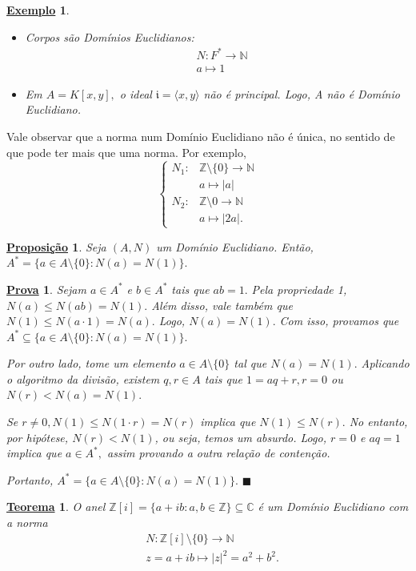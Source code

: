 \documentclass{article}
\newtheorem*{theorem*}{\underline{Teorema}}
\newtheorem*{prop*}{\underline{Proposi\c c\~ao}}
\newtheorem{example}{\underline{Exemplo}}
\newtheorem*{proof*}{\underline{Prova}}
\renewcommand\qedsymbol{$\blacksquare$}
\begin{document}
\begin{example}
  \begin{itemize}
    \item[1)] Corpos são Domínios Euclidianos:
      \begin{align*}
    &N:F^{*}\rightarrow \mathbb{N}\\
    &a\mapsto 1
      \end{align*}
    \item[2)] Em \(A = K[x, y],\) o ideal \(\mathfrak{i} = \langle x, y \rangle\) não é principal. Logo, A não é Domínio Euclidiano.
  \end{itemize}
\end{example}
Vale observar que a norma num Domínio Euclidiano não é única, no sentido de que pode ter mais que uma norma. Por exemplo,
\[
  \left\{\begin{array}{ll}
      N_{1}:&\mathbb{Z}\setminus{\{0\}}\rightarrow \mathbb{N}\\
            &a\mapsto |a|\\
      N_{2}:&\mathbb{Z}\setminus{0}\rightarrow \mathbb{N}\\
            &a\mapsto |2a|.
  \end{array}\right.
\]
\begin{prop*}
  Seja \((A, N)\) um Domínio Euclidiano. Então, \(A^{*}=\{a\in A\setminus{\{0\}}: N(a) = N(1)\}.\)
\end{prop*}
\begin{proof*}
  Sejam \(a\in A^{*}\) e \(b\in A^{*}\) tais que \(ab = 1.\) Pela propriedade 1,
  \(N(a)\leq N(ab) = N(1).\) Além disso, vale também que \(N(1)\leq N(a \cdot 1) = N(a).\) Logo,
  \(N(a) = N(1).\) Com isso, provamos que \(A^{*}\subseteq{\{a\in A\setminus{\{0\}}: N(a) = N(1)\}}.\)

  Por outro lado, tome um elemento \(a\in A\setminus{\{0\}}\) tal que \(N(a) = N(1).\) Aplicando o algoritmo da divisão,
  existem \(q, r\in A\) tais que \(1 = aq + r, r = 0\) ou \(N(r) < N(a) = N(1).\)

  Se \(r\neq0, N(1)\leq N(1 \cdot r) = N(r)\) implica que \(N(1)\leq N(r).\) No entanto, por hipótese,
  \(N(r) < N(1)\), ou seja, temos um absurdo. Logo, \(r = 0\) e \(aq = 1\) implica que \(a\in A^{*},\) assim provando
  a outra relação de contenção.

  Portanto, \(A^{*}=\{a\in A\setminus{\{0\}}: N(a) = N(1)\}.\) \qedsymbol
\end{proof*}
\begin{theorem*}
  O anel \(\mathbb{Z}[i] = \{a + ib: a, b\in \mathbb{Z}\}\subseteq{\mathbb{C}}\) é um Domínio Euclidiano com a norma
  \begin{align*}
   &N:\mathbb{Z}[i]\setminus{\{0\}}\rightarrow \mathbb{N}\\
   &z = a + ib\mapsto |z|^{2} = a^{2} + b^{2}.
  \end{align*}
\end{theorem*}
\end{document}
